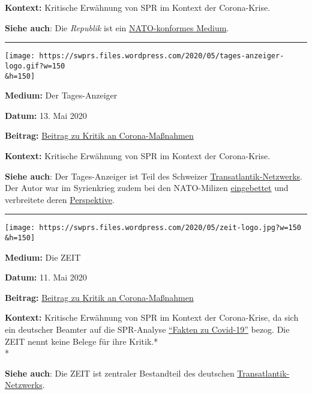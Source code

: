 \textbf{Kontext:} Kritische Erwähnung von SPR im Kontext der
Corona-Krise.

\textbf{Siehe auch}: Die \emph{Republik} ist ein
\href{https://swprs.org/die-republik-und-das-imperium/}{NATO-konformes
Medium}.

\begin{center}\rule{0.5\linewidth}{\linethickness}\end{center}

\texttt{[image: https://swprs.files.wordpress.com/2020/05/tages-anzeiger-logo.gif?w=150\\\&h=150]}

\textbf{Medium:} Der Tages-Anzeiger

\textbf{Datum:} 13. Mai 2020

\textbf{Beitrag:}
\href{https://desktop.12app.ch/articles/17266201}{Beitrag zu Kritik an
Corona-Maßnahmen}

\textbf{Kontext:} Kritische Erwähnung von SPR im Kontext der
Corona-Krise.

\textbf{Siehe auch}: Der Tages-Anzeiger ist Teil des Schweizer
\href{https://swprs.org/netzwerk-medien-schweiz/}{Transatlantik-Netzwerks}.
Der Autor war im Syrienkrieg zudem bei den NATO-Milizen
\href{https://swprs.org/2017/03/01/der-kriegsreporter/}{eingebettet} und
verbreitete deren
\href{https://swprs.org/syrienkrieg-geopolitik-medien/}{Perspektive}.

\begin{center}\rule{0.5\linewidth}{\linethickness}\end{center}

\texttt{[image: https://swprs.files.wordpress.com/2020/05/zeit-logo.jpg?w=150\\\&h=150]}

\textbf{Medium:} Die ZEIT

\textbf{Datum:} 11. Mai 2020

\textbf{Beitrag:}
\href{https://www.zeit.de/politik/deutschland/2020-05/corona-pandemie-bekaempfung-massnahmen-innenministerium-verschwoerungstheorien-regierungsrat/komplettansicht}{Beitrag
zu Kritik an Corona-Maßnahmen}

\textbf{Kontext:} Kritische Erwähnung von SPR im Kontext der
Corona-Krise, da sich ein deutscher Beamter auf die SPR-Analyse
\href{https://swprs.org/covid-19-hinweis-ii/}{``Fakten zu Covid-19''}
bezog. Die ZEIT nennt keine Belege für ihre Kritik.*\\
*

\textbf{Siehe auch}: Die ZEIT ist zentraler Bestandteil des deutschen
\href{https://swprs.org/netzwerk-medien-deutschland/}{Transatlantik-Netzwerks}.

